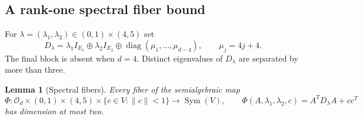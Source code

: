 \documentclass[11pt,reqno]{amsart}
\newtheorem{lemma}[lemma]{Lemma}
\theoremstyle{definition}
\theoremstyle{remark}
\numberwithin{equation}{section}
\newcommand{\Orth}{\mathcal O_d}
\newcommand{\norm}[1]{\lVert #1\rVert}
\DeclareMathOperator{\Sym}{Sym}
\DeclareMathOperator{\diag}{diag}
\begin{document}
\subsection{A rank-one spectral fiber bound}
For $\lambda=(\lambda_1,\lambda_2)\in(0,1)\times(4,5)$ set
\begin{equation}\label{eq:Dlambda}
 D_\lambda=\lambda_1I_{E_1}\oplus\lambda_2I_{E_2}
       \oplus\diag(\mu_1,\ldots,\mu_{d-4}),
 \qquad \mu_j=4j+4.
\end{equation}
The final block is absent when $d=4$. Distinct eigenvalues of
$D_\lambda$ are separated by more than three.

\begin{lemma}[Spectral fibers]\label{lem:spectral}
Every fiber of the semialgebraic map
\begin{equation}\label{eq:spectral-map}
 \Phi:\Orth\times(0,1)\times(4,5)\times\{c\in V:\norm c<1\}
 \longrightarrow\Sym(V),\qquad
 \Phi(A,\lambda_1,\lambda_2,c)=A^TD_\lambda A+cc^T
\end{equation}
has dimension at most two.
\end{lemma}
\end{document}
